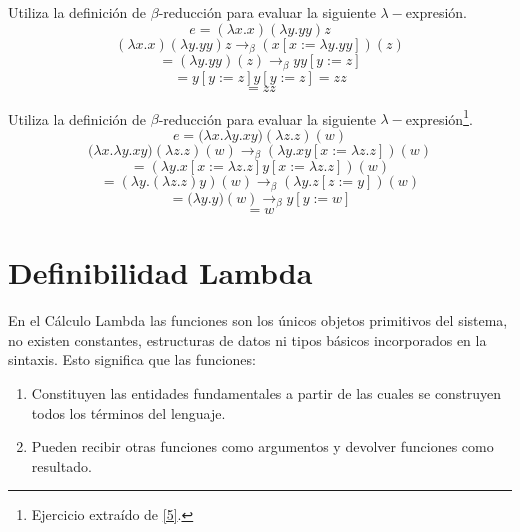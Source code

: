     \begin{exercise}
        Utiliza la definición de $\beta$-reducción para evaluar la siguiente $\lambda-$expresión.
        $$e = (\lambda x.x)(\lambda y.yy) z$$
        \[ (\lambda x.x)(\lambda y.yy) z \rightarrow_\beta (x[x:=\lambda y.yy])(z)\]
        \[ = (\lambda y.yy)(z) \rightarrow_\beta yy[y:=z]\]
        \[ =  y[y:=z]y[y:=z] = zz\]
       \[= zz \]
    \end{exercise}

    \begin{exercise}
        Utiliza la definición de $\beta$-reducción para evaluar la siguiente $\lambda-$expresión\footnote{Ejercicio extraído de \hyperlink{5}{[5]}.}.
        $$e= \big(\lambda x.\lambda y.xy\big)(\lambda z.z)(w)$$
        \[\big(\lambda x.\lambda y.xy\big)(\lambda z.z)(w) \rightarrow_\beta (\lambda y.xy[x := \lambda z.z])(w) \]
        \[ =  (\lambda y.x[x := \lambda z.z]y[x := \lambda z.z])(w) \]
	 \[ = (\lambda y.(\lambda z.z)y)(w)  \rightarrow_\beta (\lambda y.z[z := y])(w) \]
        \[ = \big(\lambda y.y\big)(w) \rightarrow_\beta y[y := w] \]
        \[ = w \]
    \end{exercise}

    \section{Definibilidad Lambda}
 
 En el Cálculo Lambda las funciones son los únicos objetos primitivos del sistema, no existen constantes, estructuras de datos ni tipos básicos incorporados en la sintaxis. Esto significa que las funciones:
 \begin{enumerate}
 	\item Constituyen las entidades fundamentales a partir de las cuales se construyen todos los términos del lenguaje.
 	\item Pueden recibir otras funciones como argumentos y devolver funciones como resultado.
 \end{enumerate}
 
